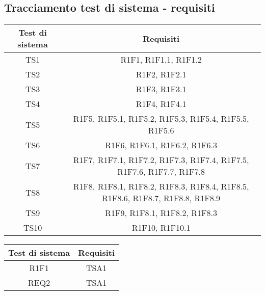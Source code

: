 \subsection{Tracciamento test di sistema - requisiti}

\begin{center}
	\begin{longtable}{|c|c|}
	\hline
	\rowcolor{lighter-grayer}
	\textbf{Test di sistema} & \textbf{Requisiti} \\
	\hline
	\endfirsthead



	\hline
	TS1 & R1F1, R1F1.1, R1F1.2  \\
	TS2 & R1F2, R1F2.1 \\
	TS3 & R1F3, R1F3.1 \\
	TS4 & R1F4, R1F4.1 \\
	TS5 & R1F5, R1F5.1, R1F5.2, R1F5.3, R1F5.4, R1F5.5, R1F5.6 \\
	TS6 & R1F6, R1F6.1, R1F6.2, R1F6.3 \\
	TS7 & R1F7, R1F7.1, R1F7.2, R1F7.3, R1F7.4, R1F7.5, R1F7.6, R1F7.7, R1F7.8 \\
	TS8 & R1F8, R1F8.1, R1F8.2, R1F8.3, R1F8.4, R1F8.5, R1F8.6, R1F8.7, R1F8.8, R1F8.9 \\
	TS9 & R1F9, R1F8.1, R1F8.2, R1F8.3 \\
	TS10 & R1F10, R1F10.1 \\

	
	\hline
	
	

	\hline

	\end{longtable}
\end{center}

\begin{center}
	\begin{longtable}{|c|c|}
	\hline
	\rowcolor{lighter-grayer}
	\textbf{Test di sistema} & \textbf{Requisiti} \\
	\hline
	\endfirsthead


	
	
	R1F1 & TSA1  \\
	REQ2 & TSA1 \\

	\hline

	\end{longtable}
\end{center}



